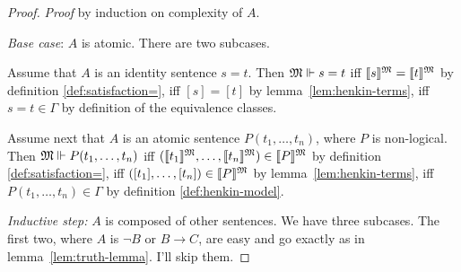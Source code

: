 \begin{proof}
  \emph{Proof}
  by induction on  complexity of $A$.

  \emph{Base case}:
  $A$ is atomic. There are two subcases.

  Assume that $A$ is an identity sentence $s=t$.
  Then $\mathfrak{M} \Vdash s=t$
  iff $\llbracket s\rrbracket^{\mathfrak{M}} = \llbracket t\rrbracket^{\mathfrak{M}}$
  by definition \ref{def:satisfaction=},
  iff $[s] = [t]$
  by lemma~\ref{lem:henkin-terms},
  iff $s=t \in \Gamma$
  by definition of the equivalence classes.

  Assume next that $A$ is an atomic sentence $P(t_{1},\ldots,t_{n})$,
  where $P$ is non-logical.
  Then $\mathfrak{M} \Vdash P(t_{1},\ldots,t_{n})$
  iff $(\llbracket t_{1}\rrbracket^{\mathfrak{M}},\ldots,\llbracket t_{n}\rrbracket^{\mathfrak{M}}) \in \llbracket P\rrbracket^{\mathfrak{M}}$
  by definition \ref{def:satisfaction=},
  iff $([t_{1}],\ldots,[t_{n}]) \in \llbracket P\rrbracket^{\mathfrak{M}}$
  by lemma~\ref{lem:henkin-terms},
  iff $P(t_{1},\ldots,t_{n}) \in \Gamma$
  by definition \ref{def:henkin-model}.

  \emph{Inductive step:}
  $A$ is composed of other sentences.
  We have three subcases.
  The first two,
  where $A$ is $\neg B$ or $B \to C$,
  are easy and go exactly as in lemma~\ref{lem:truth-lemma}.
  I'll skip them.




\end{proof}
